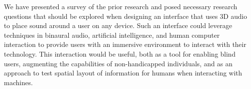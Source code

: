 We have presented a survey of the prior research and posed necessary research
questions that should be explored when designing an interface that uses 3D audio
to place sound around a user on any device. Such an interface could leverage
techniques in binaural audio, artificial intelligence, and human computer
interaction to provide users with an immersive environment to interact with
their technology. This interaction would be useful, both as a tool
for enabling blind users, augmenting the capabilities of non-handicapped
individuals, and as an approach to test spatial layout of information
for humans when interacting with machines.

\newpage                                                  {}


